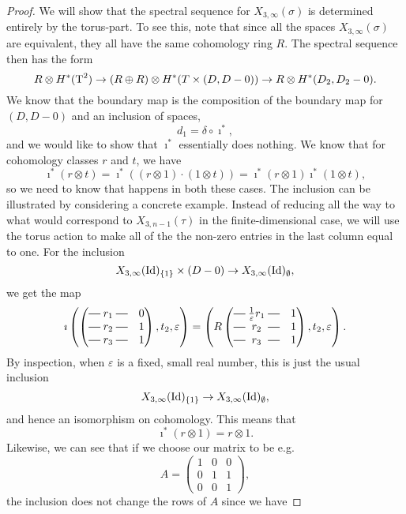 \begin{proof}
  We will show that the spectral sequence for $X_{3,\infty}(\sigma)$
  is determined entirely by the torus-part. To see this, note that
  since all the spaces $X_{3,\infty}(\sigma)$ are equivalent, they all
  have the same cohomology ring $R$. The spectral sequence then has
  the form
  \[ R \otimes H^*(\operatorname{T}^2) \to (R\oplus R)\otimes H^*(T\times (D,D-0))
  \to R\otimes H^*(D_2,D_2-0). \]
  We know that the boundary map is the composition of the boundary map
  for $(D,D-0)$ and an inclusion of spaces,
  \[ d_1 = \delta \circ \imath^*, \]
  and we would like to show that $\imath^*$ essentially does
  nothing. We know that for cohomology classes $r$ and $t$, we have
  \[ \imath^*(r \otimes t) = \imath^*((r\otimes 1)\cdot (1\otimes t))
  = \imath^*(r\otimes 1) \imath^*(1\otimes t), \]
  so we need to know that happens in both these cases. The inclusion
  can be illustrated by considering a concrete example. Instead of
  reducing all the way to what would correspond to $X_{3,n-1}(\tau)$
  in the finite-dimensional case, we will use the torus action to make
  all of the
  the non-zero entries in the last column equal to one. For the
  inclusion 
  \[X_{3,\infty}(\operatorname{Id})_{\left\{ 1 \right\}}\times(D-0) \to
  X_{3,\infty}(\operatorname{Id})_{\emptyset}, \]
  we get the map
  \[
  \imath\left(\begin{pmatrix}
      \matrow{r_1} & 0 \\
      \matrow{r_2} & 1 \\
      \matrow{r_3} & 1
    \end{pmatrix}, t_2, \varepsilon\right) = 
  \left(R\begin{pmatrix}
      \matrow{\frac{1}{\varepsilon}r_1} & 1 \\
      \matrow{r_2} & 1 \\
      \matrow{r_3} & 1
    \end{pmatrix}, t_2,\varepsilon\right). \]
  By inspection, when $\varepsilon$ is a fixed, small real number,
  this is just the usual inclusion
  \[ X_{3,\infty}(\operatorname{Id})_{\left\{ 1 \right\}} \to X_{3,\infty}(\operatorname{Id})_{\emptyset}, \]
  and hence an isomorphism on cohomology. This means that 
  \[ \imath^*(r\otimes 1) = r\otimes 1. \]
  Likewise, we can see that
  if we choose our matrix to be e.g.
  \[
  A = \begin{pmatrix}
    1 & 0 & 0 \\
    0 & 1 & 1 \\
    0 & 0 & 1
  \end{pmatrix}, \]
  the inclusion does not change the rows of $A$ since we have

\end{proof}
